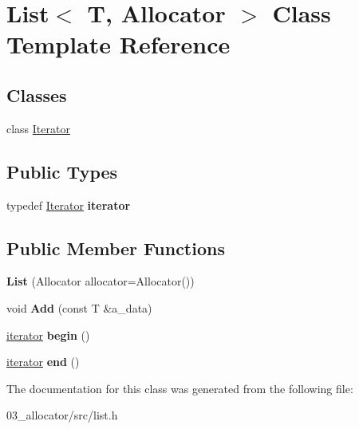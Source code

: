 \hypertarget{classList}{}\section{List$<$ T, Allocator $>$ Class Template Reference}
\label{classList}
\subsection*{Classes}
\begin{DoxyCompactItemize}
\item 
class \hyperlink{classList_1_1Iterator}{Iterator}
\end{DoxyCompactItemize}
\subsection*{Public Types}
\begin{DoxyCompactItemize}
\item 
\mbox{\label{classList_af48ad87b55adce85efe5e109643d5fc9}} 
typedef \hyperlink{classList_1_1Iterator}{Iterator} {\bfseries iterator}
\end{DoxyCompactItemize}
\subsection*{Public Member Functions}
\begin{DoxyCompactItemize}
\item 
\mbox{\label{classList_ab91c9b61f756232847dafd9f7e5d0498}} 
{\bfseries List} (Allocator allocator=Allocator())
\item 
\mbox{\label{classList_aa8c155e8e75b711ded89e714d53b8d44}} 
void {\bfseries Add} (const T \&a\+\_\+data)
\item 
\mbox{\label{classList_a8831171fca84c49d508c628fe665e306}} 
\hyperlink{classList_1_1Iterator}{iterator} {\bfseries begin} ()
\item 
\mbox{\label{classList_aa9553db662d8008d72b1e2e3a472d6c9}} 
\hyperlink{classList_1_1Iterator}{iterator} {\bfseries end} ()
\end{DoxyCompactItemize}


The documentation for this class was generated from the following file\+:\begin{DoxyCompactItemize}
\item 
03\+\_\+allocator/src/list.\+h\end{DoxyCompactItemize}

